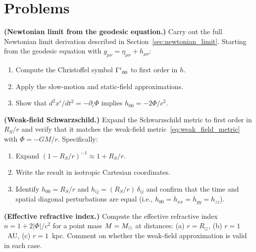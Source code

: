 \section{Problems}
\label{sec:linearized_problems}

\begin{exercise}
\label{ex:newtonian_limit_prob}
\textbf{(Newtonian limit from the geodesic equation.)}
Carry out the full Newtonian limit derivation described in
Section~\ref{sec:newtonian_limit}.  Starting from the geodesic
equation with $g_{\mu\nu} = \eta_{\mu\nu} + h_{\mu\nu}$:
\begin{enumerate}[label=(\alph*)]
    \item Compute the Christoffel symbol $\Gamma^{i}_{\ 0 0}$ to
          first order in $h$.
    \item Apply the slow-motion and static-field approximations.
    \item Show that $d^2 x^i/dt^2 = -\partial_i \Phi$ implies
          $h_{00} = -2\Phi/c^2$.
\end{enumerate}
\end{exercise}

\begin{exercise}
\label{ex:weak_field_schwarzschild}
\textbf{(Weak-field Schwarzschild.)}
Expand the Schwarzschild metric to first order in $R_S/r$ and verify
that it matches the weak-field metric~\eqref{eq:weak_field_metric}
with $\Phi = -GM/r$.  Specifically:
\begin{enumerate}[label=(\alph*)]
    \item Expand $(1 - R_S/r)^{-1} \approx 1 + R_S/r$.
    \item Write the result in isotropic Cartesian coordinates.
    \item Identify $h_{00} = R_S/r$ and $h_{ij} = (R_S/r)\,\delta_{ij}$
          and confirm that the time and spatial diagonal perturbations
          are equal (i.e., $h_{00} = h_{xx} = h_{yy} = h_{zz}$).
\end{enumerate}
\end{exercise}

\begin{exercise}
\label{ex:refractive_index_prob}
\textbf{(Effective refractive index.)}
Compute the effective refractive index $n = 1 + 2|\Phi|/c^2$ for a
point mass $M = M_{\odot}$ at distances:
(a) $r = R_\odot$,
(b) $r = 1$~AU,
(c) $r = 1$~kpc.
Comment on whether the weak-field approximation is valid in each case.
\end{exercise}

